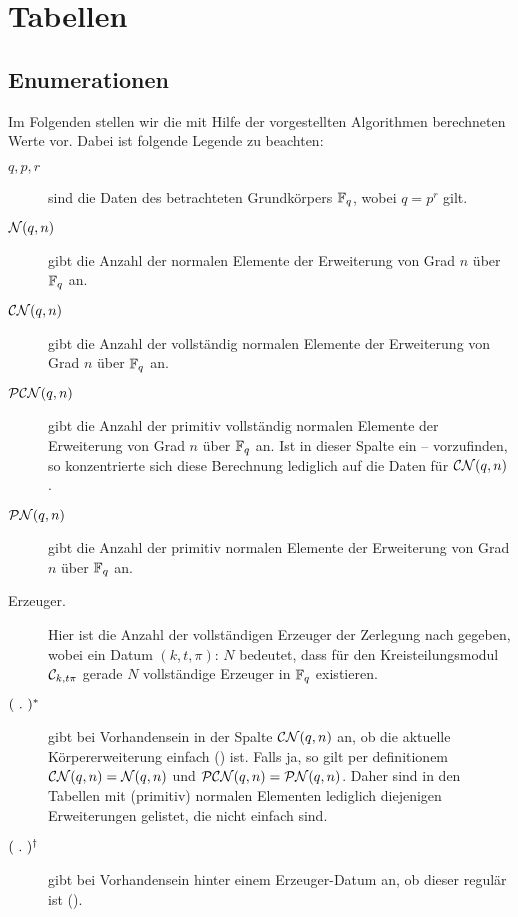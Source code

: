 \chapter{Tabellen}

\section{Enumerationen}

Im Folgenden stellen wir die mit Hilfe der vorgestellten Algorithmen
berechneten Werte vor. Dabei ist folgende Legende zu beachten:
\begin{description}
  \item[$q, p,r$] sind die Daten des betrachteten Grundkörpers $\F_q$, wobei
    $q = p^r$ gilt.
  \item[$\cal N(q,n)$] gibt die Anzahl der normalen Elemente
    der Erweiterung von Grad $n$ über $\F_q$ an.
  \item[$\CN(q,n)$] gibt die Anzahl der vollständig normalen Elemente
    der Erweiterung von Grad $n$ über $\F_q$ an.
  \item[$\PCN(q,n)$] gibt die Anzahl der primitiv vollständig normalen Elemente 
    der Erweiterung von Grad $n$ über $\F_q$ an. Ist in dieser Spalte ein
    -- vorzufinden, so konzentrierte sich diese Berechnung lediglich auf 
    die Daten für $\CN(q,n)$.
  \item[$\PN(q,n)$] gibt die Anzahl der primitiv normalen Elemente 
    der Erweiterung von Grad $n$ über $\F_q$ an.
  \item[\normalfont Erzeuger.] Hier ist die Anzahl der vollständigen Erzeuger
    der Zerlegung nach  gegeben, wobei ein Datum
    $(k,t,\pi):\, N$ bedeutet, dass für den Kreisteilungsmodul 
    $\C_{k,t\pi}$ gerade $N$ vollständige Erzeuger in $\F_q$ existieren.
  \item[$(\speq.)^\ast$] gibt bei Vorhandensein in der Spalte $\CN(q,n)$ an, 
    ob die aktuelle Körpererweiterung einfach () ist.
    Falls ja, so gilt per definitionem 
    $\CN(q,n) = \cal N(q,n)$ und $\PCN(q,n) = \PN(q,n)$.
    Daher sind in den Tabellen mit (primitiv) normalen Elementen lediglich
    diejenigen Erweiterungen gelistet, die nicht einfach sind.
  \item[$(\speq.)^\dagger$] gibt bei Vorhandensein hinter einem Erzeuger-Datum
    an, ob dieser regulär ist ().
\end{description}

